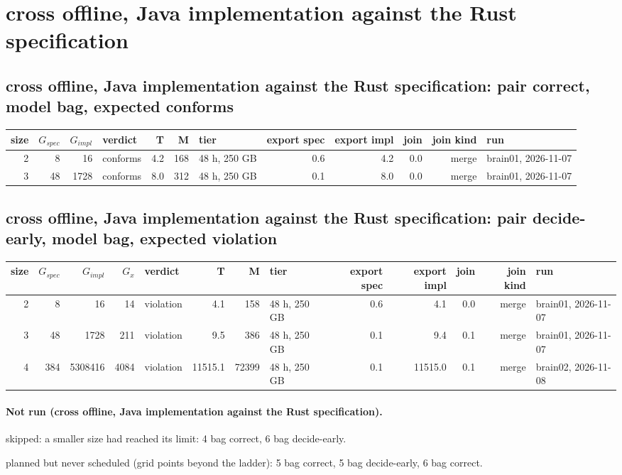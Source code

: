 \documentclass[10pt]{article}
\begin{document}
\section*{cross offline, Java implementation against the Rust specification}
\subsection*{cross offline, Java implementation against the Rust specification: pair \textsf{correct}, model bag, expected conforms}
\begin{longtable}{@{}rrrlrrlrrrrl@{}}
\toprule
size & $G_{\mathit{spec}}$ & $G_{\mathit{impl}}$ & verdict & T & M & tier & export spec & export impl & join & join kind & run \\
\midrule
\endhead
\color{blue} 2 & 8 & 16 & conforms & 4.2 & 168 & 48 h, 250 GB & 0.6 & 4.2 & 0.0 & merge & brain01, 2026-11-07 \\
\color{blue} 3 & 48 & 1728 & conforms & 8.0 & 312 & 48 h, 250 GB & 0.1 & 8.0 & 0.0 & merge & brain01, 2026-11-07 \\
\bottomrule
\end{longtable}
\subsection*{cross offline, Java implementation against the Rust specification: pair \textsf{decide-early}, model bag, expected violation}
\begin{longtable}{@{}rrrrlrrlrrrrl@{}}
\toprule
size & $G_{\mathit{spec}}$ & $G_{\mathit{impl}}$ & $G_x$ & verdict & T & M & tier & export spec & export impl & join & join kind & run \\
\midrule
\endhead
\color{blue} 2 & 8 & 16 & 14 & violation & 4.1 & 158 & 48 h, 250 GB & 0.6 & 4.1 & 0.0 & merge & brain01, 2026-11-07 \\
\color{blue} 3 & 48 & 1728 & 211 & violation & 9.5 & 386 & 48 h, 250 GB & 0.1 & 9.4 & 0.1 & merge & brain01, 2026-11-07 \\
\color{blue} 4 & 384 & 5308416 & 4084 & violation & 11515.1 & 72399 & 48 h, 250 GB & 0.1 & 11515.0 & 0.1 & merge & brain02, 2026-11-08 \\
\bottomrule
\end{longtable}
\paragraph{Not run (cross offline, Java implementation against the Rust specification).}
skipped: a smaller size had reached its limit: 4 bag correct, 6 bag decide-early.\par
planned but never scheduled (grid points beyond the ladder): 5 bag correct, 5 bag decide-early, 6 bag correct.\par
\end{document}
